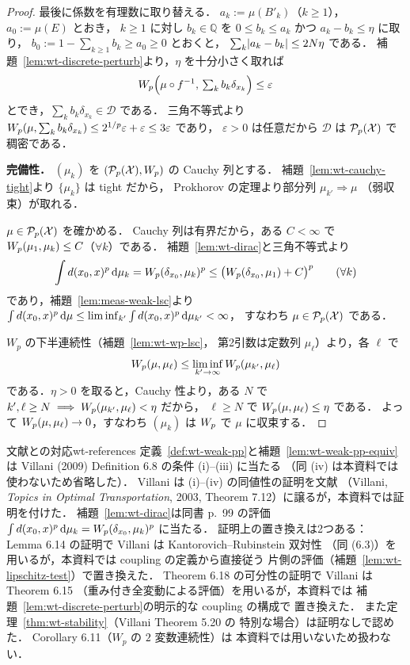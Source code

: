 \begin{proof}
  最後に係数を有理数に取り替える．
  $a_k:=\mu(B'_k)$（$k\geq1$），$a_0:=\mu(E)$ とおき，
  $k\geq1$ に対し $b_k\in\mathbb{Q}$ を
  $0\leq b_k\leq a_k$ かつ $a_k-b_k\leq\eta$ に取り，
  $b_0:=1-\sum_{k\geq1}b_k\geq a_0\geq0$ とおくと，
  $\sum_k\lvert a_k-b_k \rvert\leq2N\eta$ である．
  補題~\ref{lem:wt-discrete-perturb}より，$\eta$ を十分小さく取れば
  \[
    W_p\Bigl(\mu\circ f^{-1},\,
    \textstyle\sum_kb_k\delta_{x_k}\Bigr)\leq\varepsilon
  \]
  とでき，$\sum_kb_k\delta_{x_k}\in\mathcal{D}$ である．
  三角不等式より
  $W_p(\mu,\sum_kb_k\delta_{x_k})
  \leq2^{1/p}\varepsilon+\varepsilon\leq3\varepsilon$ であり，
  $\varepsilon>0$ は任意だから $\mathcal{D}$ は
  $\mathcal{P}_{p}(\mathcal{X})$ で稠密である．

  \textbf{完備性．}
  $(\mu_k)$ を $(\mathcal{P}_{p}(\mathcal{X}),W_p)$ の Cauchy 列とする．
  補題~\ref{lem:wt-cauchy-tight}より $\{\mu_k\}$ は tight だから，
  Prokhorov の定理より部分列 $\mu_{k'}\Rightarrow\mu$
  （弱収束）が取れる．

  $\mu\in\mathcal{P}_{p}(\mathcal{X})$ を確かめる．
  Cauchy 列は有界だから，ある $C<\infty$ で
  $W_p(\mu_1,\mu_k)\leq C$（$\forall k$）である．
  補題~\ref{lem:wt-dirac}と三角不等式より
  \[
    \int d(x_0,x)^p\,\mathrm{d}\mu_k
    =W_p(\delta_{x_0},\mu_k)^p
    \leq\bigl(W_p(\delta_{x_0},\mu_1)+C\bigr)^p
    \qquad(\forall k)
  \]
  であり，補題~\ref{lem:meas-weak-lsc}より
  $\int d(x_0,x)^p\,\mathrm{d}\mu
  \leq\liminf_{k'}\int d(x_0,x)^p\,\mathrm{d}\mu_{k'}<\infty$，
  すなわち $\mu\in\mathcal{P}_{p}(\mathcal{X})$ である．

  $W_p$ の下半連続性（補題~\ref{lem:wt-wp-lsc}，
  第2引数は定数列 $\mu_\ell$）より，各 $\ell$ で
  \[
    W_p(\mu,\mu_\ell)
    \leq\liminf_{k'\to\infty}W_p(\mu_{k'},\mu_\ell)
  \]
  である．$\eta>0$ を取ると，Cauchy 性より，ある $N$ で
  $k',\ell\geq N\implies W_p(\mu_{k'},\mu_\ell)<\eta$ だから，
  $\ell\geq N$ で $W_p(\mu,\mu_\ell)\leq\eta$ である．
  よって $W_p(\mu,\mu_\ell)\to0$，すなわち
  $(\mu_k)$ は $W_p$ で $\mu$ に収束する．
\end{proof}

\begin{remark}{文献との対応}{wt-references}
  定義~\ref{def:wt-weak-pp}と補題~\ref{lem:wt-weak-pp-equiv}は
  Villani (2009) Definition 6.8 の条件 (i)--(iii) に当たる
  （同 (iv) は本資料では使わないため省略した）．
  Villani は (i)--(iv) の同値性の証明を文献
  （Villani, \emph{Topics in Optimal Transportation}, 2003,
  Theorem 7.12）に譲るが，本資料では証明を付けた．
  補題~\ref{lem:wt-dirac}は同書 p.~99 の評価
  $\int d(x_0,x)^p\,\mathrm{d}\mu_k=W_p(\delta_{x_0},\mu_k)^p$ に当たる．
  証明上の置き換えは2つある：
  Lemma 6.14 の証明で Villani は Kantorovich--Rubinstein 双対性
  （同 (6.3)）を用いるが，本資料では coupling の定義から直接従う
  片側の評価（補題~\ref{lem:wt-lipschitz-test}）で置き換えた．
  Theorem 6.18 の可分性の証明で Villani は Theorem 6.15
  （重み付き全変動による評価）を用いるが，本資料では
  補題~\ref{lem:wt-discrete-perturb}の明示的な coupling の構成で
  置き換えた．
  また定理~\ref{thm:wt-stability}（Villani Theorem 5.20 の
  特別な場合）は証明なしで認めた．
  Corollary 6.11（$W_p$ の $2$ 変数連続性）は
  本資料では用いないため扱わない．
\end{remark}
